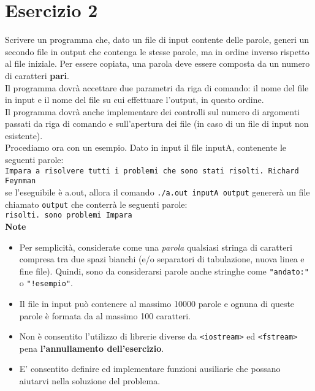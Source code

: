 \documentclass{article}
\begin{document}
\section*{Esercizio 2}

    Scrivere un programma che, dato un file di input
    contente delle parole, generi un secondo file in output che contenga le stesse
    parole, ma in ordine inverso rispetto al file iniziale. Per essere copiata, una
    parola deve essere composta da un numero di caratteri \textbf{pari}.\\
    
    \noindent Il programma dovrà accettare due parametri da riga di comando: il nome
    del file in input e il nome del file su cui effettuare l'output, in questo ordine.\\
    
    \noindent Il programma dovrà anche implementare dei controlli sul numero di argomenti
    passati da riga di comando e sull'apertura dei file (in caso di un file
    di input non esistente).\\
    
    \noindent Procediamo ora con un esempio. Dato in input il file input\textunderscore A, contenente le seguenti parole:\\
    
    \noindent \texttt{Impara a risolvere tutti i problemi che sono stati risolti.
    Richard Feynman}\\

    \noindent se l'eseguibile è a.out, allora il comando \texttt{./a.out input\textunderscore A output} genererà un file chiamato \texttt{output} che conterrà le seguenti parole:\\
    
    \noindent \texttt{risolti. sono problemi Impara}\\
    
    \noindent \textbf{Note}
    \begin{itemize}
        \item Per semplicità, considerate come una \textit{parola} qualsiasi stringa di caratteri
        compresa tra due spazi bianchi (e/o separatori di tabulazione,
        nuova linea e fine file). Quindi, sono da considerarsi parole anche
        stringhe come \texttt{"andato:"} o \texttt{"!esempio"}.
        \item Il file in input può contenere al massimo 10000 parole e ognuna di
        queste parole è formata da al massimo 100 caratteri.
        \item Non è consentito l'utilizzo di librerie diverse da \texttt{<iostream>} ed \texttt{<fstream>} pena \textbf{l'annullamento dell'esercizio}.
        \item E' consentito definire ed implementare funzioni ausiliarie che possano\\
        aiutarvi nella soluzione del problema.
    \end{itemize}
\end{document}
